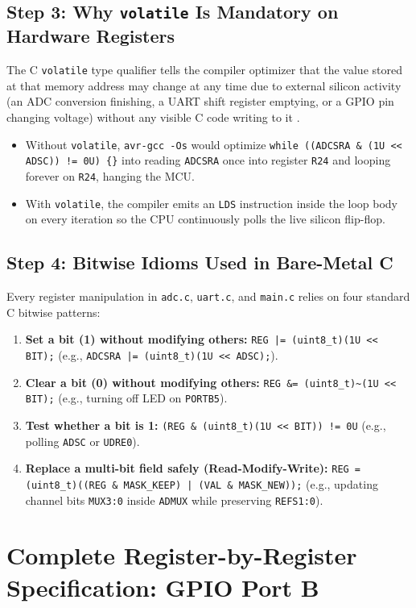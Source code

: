 \documentclass[11pt,a4paper,oneside]{report}
\begin{document}
\subsection{Step 3: Why \texttt{volatile} Is Mandatory on Hardware Registers}
The C \texttt{volatile} type qualifier tells the compiler optimizer that the value stored at that memory address may change at any time due to external silicon activity (an ADC conversion finishing, a UART shift register emptying, or a GPIO pin changing voltage) without any visible C code writing to it \cite{gustedt2025,seacord2020}.
\begin{itemize}
\item Without \texttt{volatile}, \texttt{avr-gcc -Os} would optimize \texttt{while ((ADCSRA \& (1U << ADSC)) != 0U) \{\}} into reading \texttt{ADCSRA} once into register \texttt{R24} and looping forever on \texttt{R24}, hanging the MCU.
\item With \texttt{volatile}, the compiler emits an \texttt{LDS} instruction inside the loop body on every iteration so the CPU continuously polls the live silicon flip-flop.
\end{itemize}

\subsection{Step 4: Bitwise Idioms Used in Bare-Metal C}
Every register manipulation in \texttt{adc.c}, \texttt{uart.c}, and \texttt{main.c} relies on four standard C bitwise patterns:
\begin{enumerate}
\item \textbf{Set a bit (1) without modifying others:} \texttt{REG |= (uint8\_t)(1U << BIT);} (e.g., \texttt{ADCSRA |= (uint8\_t)(1U << ADSC);}).
\item \textbf{Clear a bit (0) without modifying others:} \texttt{REG \&= (uint8\_t)\textasciitilde(1U << BIT);} (e.g., turning off LED on \texttt{PORTB5}).
\item \textbf{Test whether a bit is 1:} \texttt{(REG \& (uint8\_t)(1U << BIT)) != 0U} (e.g., polling \texttt{ADSC} or \texttt{UDRE0}).
\item \textbf{Replace a multi-bit field safely (Read-Modify-Write):} \texttt{REG = (uint8\_t)((REG \& MASK\_KEEP) | (VAL \& MASK\_NEW));} (e.g., updating channel bits \texttt{MUX3:0} inside \texttt{ADMUX} while preserving \texttt{REFS1:0}).
\end{enumerate}

\section{Complete Register-by-Register Specification: GPIO Port B}
\end{document}
